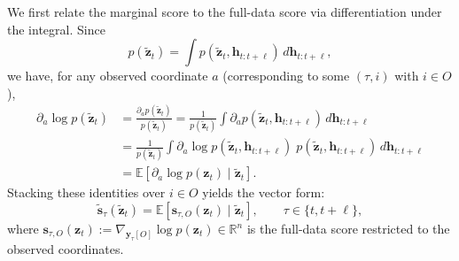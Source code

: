 \documentclass{article}
\theoremstyle{plain}
\theoremstyle{definition}
\theoremstyle{remark}
\newcommand{\R}{\mathbb{R}}
\newcommand{\E}{\mathbb{E}}
\newcommand{\1}{\mathbf{1}}
\newcommand{\y}{\bm{y}}
\newcommand{\z}{\bm{z}}
\newcommand{\h}{\bm{h}}
\newcommand{\s}{\bm{s}}
\begin{document}
We first relate the marginal score to the full-data score via differentiation under the integral. Since
$$
p(\tilde{\z}_t) = \int p(\tilde{\z}_t,\h_{t:t+\ell})\, d\h_{t:t+\ell},
$$
we have, for any observed coordinate $a$ (corresponding to some $(\tau,i)$ with $i\in O$),
\begin{align}
\partial_a \log p(\tilde{\z}_t)
&=
\frac{\partial_a p(\tilde{\z}_t)}{p(\tilde{\z}_t)}
=
\frac{1}{p(\tilde{\z}_t)}
\int \partial_a p(\tilde{\z}_t,\h_{t:t+\ell})\, d\h_{t:t+\ell}
\nonumber\\
&=
\frac{1}{p(\tilde{\z}_t)}
\int \partial_a \log p(\tilde{\z}_t,\h_{t:t+\ell})\; p(\tilde{\z}_t,\h_{t:t+\ell})\, d\h_{t:t+\ell}
\nonumber\\
&=
\E\!\left[\partial_a \log p(\z_t)\mid \tilde{\z}_t\right].
\label{eq:fisher_identity_scalar}
\end{align}
Stacking these identities over $i\in O$ yields the vector form:
\begin{equation}
\tilde{\s}_\tau(\tilde{\z}_t)
=
\E\!\left[\s_{\tau,O}(\z_t)\mid \tilde{\z}_t\right],
\qquad \tau\in\{t,t+\ell\},
\label{eq:fisher_identity_vector}
\end{equation}
where $\s_{\tau,O}(\z_t):=\nabla_{\y_\tau[O]}\log p(\z_t)\in\R^{n}$ is the full-data score restricted to the observed coordinates.
\end{document}
